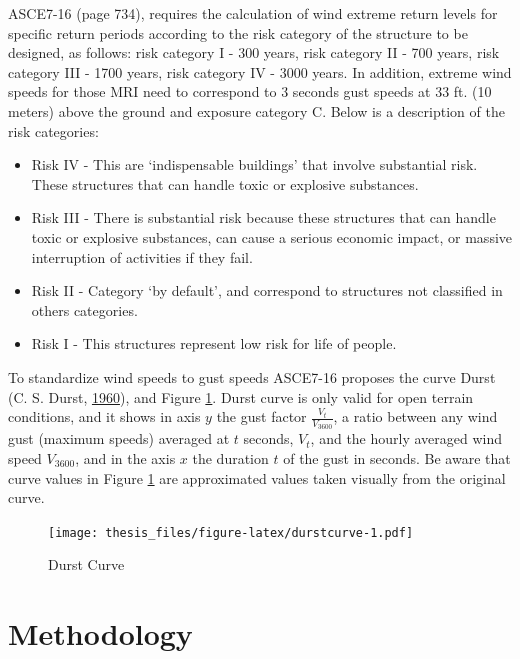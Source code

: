 \documentclass[12pt,oneside]{reedthesis}
\providecommand{\tightlist}{%
  \setlength{\itemsep}{0pt}\setlength{\parskip}{0pt}}
\begin{document}
ASCE7-16 (page 734), requires the calculation of wind extreme return levels for specific return periods according to the risk category of the structure to be designed, as follows: risk category I - 300 years, risk category II - 700 years, risk category III - 1700 years, risk category IV - 3000 years. In addition, extreme wind speeds for those MRI need to correspond to 3 seconds gust speeds at 33 ft. (10 meters) above the ground and exposure category C. Below is a description of the risk categories:
\begin{itemize}
\tightlist
\item
  Risk IV - This are `indispensable buildings' that involve substantial risk. These structures that can handle toxic or explosive substances.
\item
  Risk III - There is substantial risk because these structures that can handle toxic or explosive substances, can cause a serious economic impact, or massive interruption of activities if they fail.
\item
  Risk II - Category `by default', and correspond to structures not classified in others categories.
\item
  Risk I - This structures represent low risk for life of people.
\end{itemize}
To standardize wind speeds to gust speeds ASCE7-16 proposes the curve Durst (C. S. Durst, \protect\hyperlink{ref-Durst1960}{1960}), and Figure \ref{fig:durstcurve}. Durst curve is only valid for open terrain conditions, and it shows in axis \(y\) the gust factor \(\frac{V_t}{V_{3600}}\), a ratio between any wind gust (maximum speeds) averaged at \(t\) seconds, \(V_t\), and the hourly averaged wind speed \(V_{3600}\), and in the axis \(x\) the duration \(t\) of the gust in seconds. Be aware that curve values in Figure \ref{fig:durstcurve} are approximated values taken visually from the original curve.
\begin{figure}
\centering
\texttt{[image: thesis\_files/figure-latex/durstcurve-1.pdf]}
\caption{\label{fig:durstcurve}Durst Curve}
\end{figure}
\hypertarget{rmd-method}{%
\chapter{Methodology}\label{rmd-method}}
\end{document}
